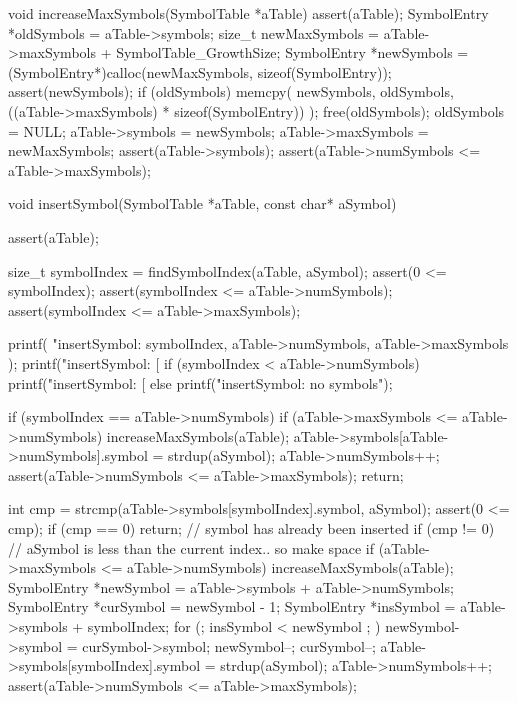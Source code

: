 void increaseMaxSymbols(SymbolTable *aTable) {
  assert(aTable);
  SymbolEntry *oldSymbols = aTable->symbols;
  size_t newMaxSymbols    = aTable->maxSymbols + SymbolTable_GrowthSize;
  SymbolEntry *newSymbols =
    (SymbolEntry*)calloc(newMaxSymbols, sizeof(SymbolEntry));
  assert(newSymbols);
  if (oldSymbols) {
    memcpy(
      newSymbols,
      oldSymbols,
      ((aTable->maxSymbols) * sizeof(SymbolEntry))
    );
    free(oldSymbols);
    oldSymbols = NULL;
  }
  aTable->symbols    = newSymbols;
  aTable->maxSymbols = newMaxSymbols;
  assert(aTable->symbols);
  assert(aTable->numSymbols <= aTable->maxSymbols);
}

void insertSymbol(SymbolTable *aTable, const char* aSymbol) {
  assert(aTable);
  
  size_t symbolIndex = findSymbolIndex(aTable, aSymbol);
  assert(0 <= symbolIndex);
  assert(symbolIndex <= aTable->numSymbols);
  assert(symbolIndex <= aTable->maxSymbols);
  
  printf(
    "insertSymbol: %
    symbolIndex,
    aTable->numSymbols,
    aTable->maxSymbols
  );
  printf("insertSymbol: [%
  if (symbolIndex < aTable->numSymbols) {
    printf("insertSymbol: [%
  } else {
    printf("insertSymbol: no symbols\n");
  }
  
  if (symbolIndex == aTable->numSymbols) {
    if (aTable->maxSymbols <= aTable->numSymbols) increaseMaxSymbols(aTable);
    aTable->symbols[aTable->numSymbols].symbol = strdup(aSymbol);
    aTable->numSymbols++;
    assert(aTable->numSymbols <= aTable->maxSymbols);
    return;
  }
  
  int cmp = strcmp(aTable->symbols[symbolIndex].symbol, aSymbol);
  assert(0 <= cmp);
  if (cmp == 0) return; // symbol has already been inserted
  if (cmp != 0) { // aSymbol is less than the current index.. so make space
    if (aTable->maxSymbols <= aTable->numSymbols) increaseMaxSymbols(aTable);
    SymbolEntry *newSymbol = aTable->symbols + aTable->numSymbols;
    SymbolEntry *curSymbol = newSymbol - 1;
    SymbolEntry *insSymbol = aTable->symbols + symbolIndex;
    for (; insSymbol < newSymbol ; ) {
      newSymbol->symbol = curSymbol->symbol;
      newSymbol--;
      curSymbol--;
    }
  }
  aTable->symbols[symbolIndex].symbol = strdup(aSymbol);
  aTable->numSymbols++;
  assert(aTable->numSymbols <= aTable->maxSymbols);
}

